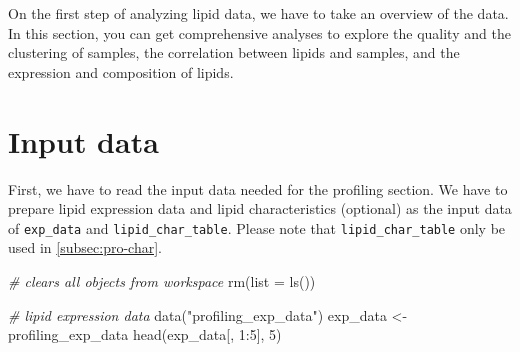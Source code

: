 \documentclass[]{article}
\newcommand{\hlnum}[1]{\textcolor[rgb]{0.816,0.125,0.439}{#1}}%
\newcommand{\hlstr}[1]{\textcolor[rgb]{0.251,0.627,0.251}{#1}}%
\newcommand{\hlcom}[1]{\textcolor[rgb]{0.502,0.502,0.502}{\textit{#1}}}%
\newcommand{\hlopt}[1]{\textcolor[rgb]{0,0,0}{#1}}%
\newcommand{\hlstd}[1]{\textcolor[rgb]{0.251,0.251,0.251}{#1}}%
\newcommand{\hlkwc}[1]{\textcolor[rgb]{0.251,0.251,0.251}{#1}}%
\newcommand{\hlkwd}[1]{\textcolor[rgb]{0.878,0.439,0.125}{#1}}%
\newenvironment{Shaded}{\begin{myshaded}}{\end{myshaded}}
\newcommand{\KeywordTok}[1]{\hlkwd{#1}}
\newcommand{\DataTypeTok}[1]{\hlkwc{#1}}
\newcommand{\DecValTok}[1]{\hlnum{#1}}
\newcommand{\StringTok}[1]{\hlstr{#1}}
\newcommand{\CommentTok}[1]{\hlcom{#1}}
\newcommand{\OperatorTok}[1]{\hlopt{#1}}
\newcommand{\NormalTok}[1]{\hlstd{#1}}
\begin{document}
On the first step of analyzing lipid data, we have to take an overview of the data. In this section, you can get comprehensive analyses to explore the quality and the clustering of samples, the correlation between lipids and samples, and the expression and composition of lipids.

\hypertarget{input-data}{%
\section{Input data}\label{input-data}}

First, we have to read the input data needed for the profiling section. We have to prepare lipid expression data and lipid characteristics (optional) as the input data of \texttt{exp\_data} and \texttt{lipid\_char\_table}. Please note that \texttt{lipid\_char\_table} only be used in \ref{subsec:pro-char}.

\begin{Shaded}
\begin{Highlighting}[]
\CommentTok{# clears all objects from workspace}
\KeywordTok{rm}\NormalTok{(}\DataTypeTok{list =} \KeywordTok{ls}\NormalTok{())}

\CommentTok{# lipid expression data }
\KeywordTok{data}\NormalTok{(}\StringTok{"profiling_exp_data"}\NormalTok{)}
\NormalTok{exp_data <-}\StringTok{ }\NormalTok{profiling_exp_data}
\KeywordTok{head}\NormalTok{(exp_data[, }\DecValTok{1}\OperatorTok{:}\DecValTok{5}\NormalTok{], }\DecValTok{5}\NormalTok{)}
\end{Highlighting}
\end{Shaded}


  \providecommand{\huxb}[2]{\arrayrulecolor[RGB]{#1}\global\arrayrulewidth=#2pt}
  \providecommand{\huxvb}[2]{\color[RGB]{#1}\vrule width #2pt}
  \providecommand{\huxtpad}[1]{\rule{0pt}{#1}}
  \providecommand{\huxbpad}[1]{\rule[-#1]{0pt}{#1}}
\end{document}
